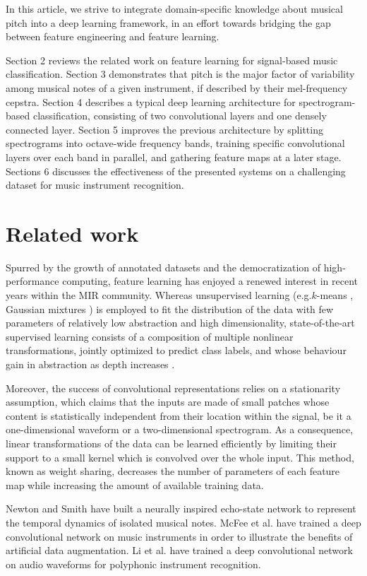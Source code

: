 \documentclass{article}
\makeatletter
\newcommand*{\eg}{e.g.\@\xspace}
\newcommand*{\etal}{et al.\@\xspace}
\makeatother
\begin{document}
In this article, we strive to integrate domain-specific knowledge about musical
pitch into a deep learning framework, in an effort towards bridging the gap
between feature engineering and feature learning.

Section 2 reviews the related work on feature learning for signal-based music
classification.
Section 3 demonstrates that pitch is the major factor of variability among musical
notes of a given instrument, if described by their mel-frequency cepstra.
Section 4 describes a typical deep learning architecture for spectrogram-based
classification, consisting of two convolutional layers and one densely connected layer.
Section 5 improves the previous architecture by splitting spectrograms into
octave-wide frequency bands, training specific convolutional layers over each band
in parallel, and gathering feature maps at a later stage.
Sections 6 discusses the effectiveness of the presented systems on a challenging
dataset for music instrument recognition.

\section{Related work}
Spurred by the growth of annotated datasets and the democratization of
high-performance computing, feature learning has enjoyed a renewed interest
in recent years within the MIR community.
Whereas unsupervised learning (\eg $k$-means \cite{Stowell2014}, Gaussian
mixtures \cite{Joder2009}) is employed to fit the distribution of the data with
few parameters of relatively low abstraction
and high dimensionality, state-of-the-art supervised learning consists of a
composition of multiple nonlinear transformations, jointly optimized
to predict class labels, and whose behaviour gain in abstraction as depth
increases \cite{vandenOord2013}.

Moreover, the success of convolutional representations relies on a
stationarity assumption, which claims that the inputs are made
of small patches whose content is statistically independent
from their location within the signal, be it a one-dimensional waveform or
a two-dimensional spectrogram.
As a consequence, linear transformations of the data can be learned efficiently
by limiting their support to a small kernel which is convolved over
the whole input.
This method, known as weight sharing, decreases the number of parameters
of each feature map while increasing the amount of available training data.

Newton and Smith \cite{Newton2012} have built a neurally inspired echo-state
network to represent the temporal dynamics of isolated musical notes.
McFee \etal \cite{McFee2015-muda} have trained a deep convolutional network on
music instruments in order to illustrate the benefits of
artificial data augmentation.
Li \etal \cite{Li2015} have trained a deep convolutional network on audio waveforms
for polyphonic instrument recognition.
\end{document}
